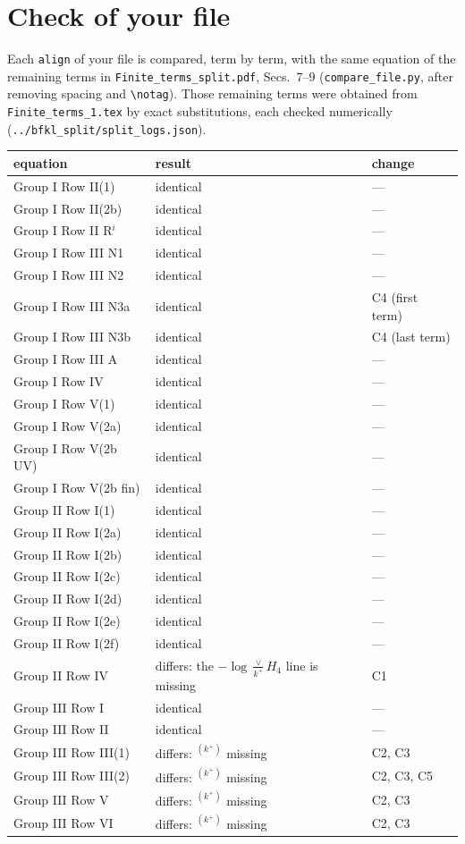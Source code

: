\documentclass[9pt]{article}
\numberwithin{equation}{section}
\begin{document}
\section{Check of your file}\label{sec:check}
Each \texttt{align} of your file is compared, term by term, with the same equation of the remaining terms in \texttt{Finite\_terms\_split.pdf}, Secs.~7--9 (\texttt{compare\_file.py}, after removing spacing and \verb|\notag|). Those remaining terms were obtained from \texttt{Finite\_terms\_1.tex} by exact substitutions, each checked numerically (\texttt{../bfkl\_split/split\_logs.json}).
\begin{center}\small
\begin{longtable}{@{}lll@{}}\toprule
equation & result & change\\\midrule\endhead
Group I Row II(1) & identical & ---\\
Group I Row II(2b) & identical & ---\\
Group I Row II R$^i$ & identical & ---\\
Group I Row III N1 & identical & ---\\
Group I Row III N2 & identical & ---\\
Group I Row III N3a & identical & C4 (first term)\\
Group I Row III N3b & identical & C4 (last term)\\
Group I Row III A & identical & ---\\
Group I Row IV & identical & ---\\
Group I Row V(1) & identical & ---\\
Group I Row V(2a) & identical & ---\\
Group I Row V(2b UV) & identical & ---\\
Group I Row V(2b fin) & identical & ---\\
Group II Row I(1) & identical & ---\\
Group II Row I(2a) & identical & ---\\
Group II Row I(2b) & identical & ---\\
Group II Row I(2c) & identical & ---\\
Group II Row I(2d) & identical & ---\\
Group II Row I(2e) & identical & ---\\
Group II Row I(2f) & identical & ---\\
Group II Row IV & differs: the $-\log\frac{\vee}{k^+}H_4$ line is missing & C1\\
Group III Row I & identical & ---\\
Group III Row II & identical & ---\\
Group III Row III(1) & differs: $^{(k^+)}$ missing & C2, C3\\
Group III Row III(2) & differs: $^{(k^+)}$ missing & C2, C3, C5\\
Group III Row V & differs: $^{(k^+)}$ missing & C2, C3\\
Group III Row VI & differs: $^{(k^+)}$ missing & C2, C3\\
\bottomrule
\end{longtable}
\end{center}
\end{document}
